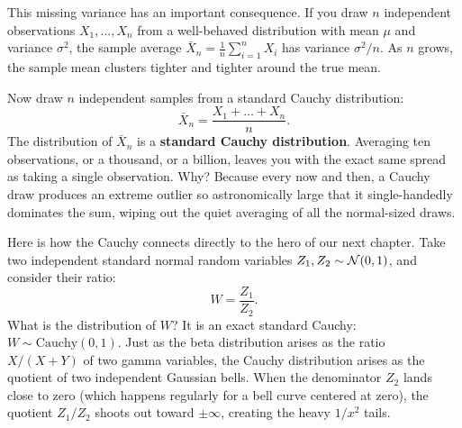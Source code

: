This missing variance has an important consequence. If you draw $n$ independent
observations $X_1, \dots, X_n$ from a well-behaved distribution with mean $\mu$ and
variance $\sigma^2$, the sample average $\bar X_n = \frac{1}{n}\sum_{i=1}^n X_i$
has variance $\sigma^2/n$. As $n$ grows, the sample mean clusters tighter and
tighter around the true mean.

Now draw $n$ independent samples from a standard Cauchy distribution:
\[
  \bar X_n = \frac{X_1 + \dots + X_n}{n}.
\]
The distribution of $\bar X_n$ is a \textbf{standard Cauchy distribution}. Averaging ten observations, or a thousand, or a billion, leaves you with
the exact same spread as taking a single observation.
Why? Because every now and then, a Cauchy draw produces an extreme outlier so
astronomically large that it single-handedly dominates the sum, wiping out the
quiet averaging of all the normal-sized draws.

\begin{connectionbox}
Here is how the Cauchy connects directly to the hero of our next chapter. Take two
independent standard normal random variables $Z_1, Z_2 \sim \mathcal{N}(0,1)$, and
consider their ratio:
\[
  W = \frac{Z_1}{Z_2}.
\]
What is the distribution of $W$? It is an exact standard Cauchy: $W \sim \text{Cauchy}(0,1)$.
Just as the beta distribution arises as the ratio $X/(X+Y)$ of two gamma
variables, the Cauchy distribution arises as the quotient of two independent
Gaussian bells. When the denominator $Z_2$ lands close to zero (which happens
regularly for a bell curve centered at zero), the quotient $Z_1/Z_2$ shoots out
toward $\pm\infty$, creating the heavy $1/x^2$ tails.
\end{connectionbox}

